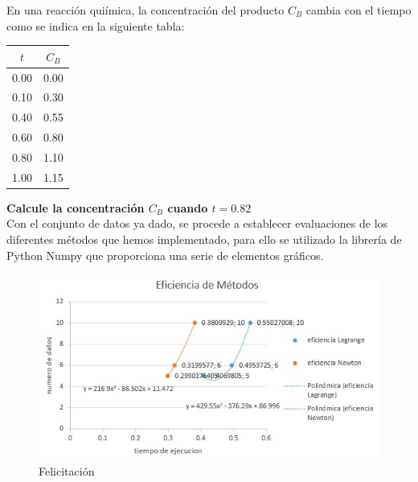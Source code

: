 \documentclass[10pt,a4paper]{article}
\begin{document}
\begin{multicols}{2}
		\noindent En una reacción quiímica, la concentración del producto $C_B$ cambia con el tiempo como se indica en la siguiente tabla:
		
		
		\begin{center}
			\begin{tabular}{ |c|c| }
				\hline
				$t$ & $C_B$ \\ \hline
				0.00 & 0.00 \\ \hline
				0.10 & 0.30 \\ \hline
				0.40 & 0.55 \\ \hline
				0.60 & 0.80 \\ \hline
				0.80 & 1.10 \\ \hline
				1.00 & 1.15 \\ \hline
			\end{tabular}
		\end{center}
		
		\textbf{Calcule la concentración $C_B$ cuando $t = 0.82$}\\
		
		Con el conjunto de datos ya dado, se procede a establecer evaluaciones de los diferentes métodos que hemos implementado, para ello se utilizado la librería de Python Numpy  que proporciona una serie de elementos gráficos.
		
		
		\vspace*{0.2cm}
		
		\begin{figure}[h]
			\begin{center}
				\includegraphics[scale=.5]{eficiencia.jpg}
				\caption{Felicitación}
			\end{center}
		\end{figure}
		
		

\end{multicols}
\end{document}
